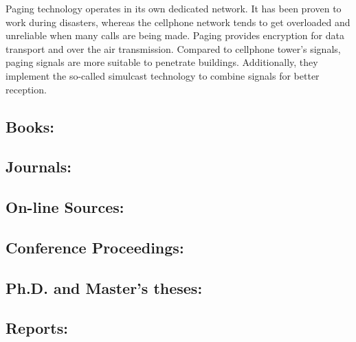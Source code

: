 \documentclass{CML_Seminar_Template}
\begin{document}
Paging technology operates in its own dedicated network. It has been proven to work during disasters, whereas the cellphone network tends to get overloaded and unreliable when many calls are being made. Paging provides encryption for data transport and over the air transmission. Compared to cellphone tower's signals, paging signals are more suitable to penetrate buildings. Additionally, they implement the so-called simulcast technology to combine signals for better reception.
\subsection*{Books:} 

\cite[]{Ham2002, MaVa1984}

\subsection*{Journals:}

\cite[]{Gro1995}

\subsection*{On-line Sources:} 

\cite[]{Bal1994}

\subsection*{Conference Proceedings:} 

\cite[]{GrPr2003}

\subsection*{Ph.D. and Master's theses:}

\cite[]{Dou1996}

\subsection*{Reports:} 

\cite[]{BeMa1993}


%


\end{document}
